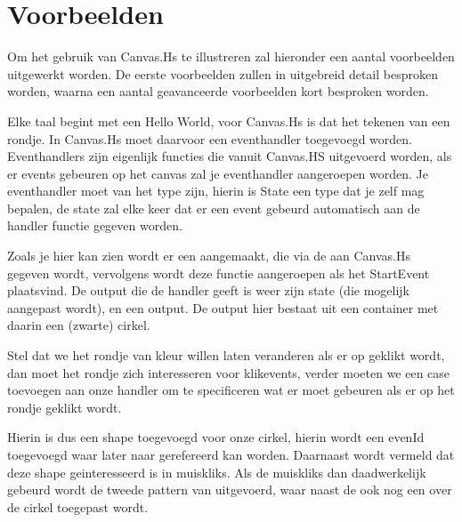 \section{Voorbeelden}
Om het gebruik van Canvas.Hs te illustreren zal hieronder een aantal voorbeelden uitgewerkt worden. De eerste voorbeelden zullen in uitgebreid detail besproken worden, waarna een aantal geavanceerde voorbeelden kort besproken worden.

Elke taal begint met een Hello World, voor Canvas.Hs is dat het tekenen van een rondje. In Canvas.Hs moet daarvoor een eventhandler toegevoegd worden. Eventhandlers zijn eigenlijk functies die vanuit Canvas.HS uitgevoerd worden, als er events gebeuren op het canvas zal je eventhandler aangeroepen worden. Je eventhandler moet van het type  zijn, hierin is State een type dat je zelf mag bepalen, de state zal elke keer dat er een event gebeurd automatisch aan de handler functie gegeven worden.



Zoals je hier kan zien wordt er een  aangemaakt, die via de  aan Canvas.Hs gegeven wordt, vervolgens wordt deze functie aangeroepen als het StartEvent plaatsvind. De output die de handler geeft is weer zijn state (die mogelijk aangepast wordt), en een output. De output hier bestaat uit een container met daarin een (zwarte) cirkel.

Stel dat we het rondje van kleur willen laten veranderen als er op geklikt wordt, dan moet het rondje zich interesseren voor klikevents, verder moeten we een case toevoegen aan onze handler om te specificeren wat er moet gebeuren als er op het rondje geklikt wordt.



Hierin is dus een  shape toegevoegd voor onze cirkel, hierin wordt een evenId toegevoegd waar later naar gerefereerd kan worden. Daarnaast wordt vermeld dat deze shape geinteresseerd is in muiskliks. Als de muiskliks dan daadwerkelijk gebeurd wordt de tweede pattern van  uitgevoerd, waar naast de  ook nog een  over de cirkel toegepast wordt.
